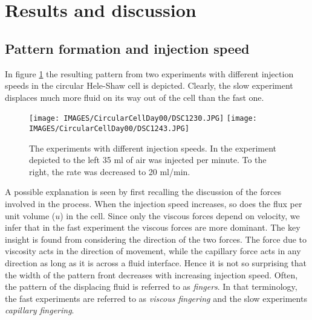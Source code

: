 \documentclass[twoside,utf8]{article}
\newcommand{\EQU}[1] { \begin{equation*} \begin{split} #1 \end{split} \end{equation*} }
\begin{document}




\section{Results and discussion}



\subsection{Pattern formation and injection speed}

In figure \ref{fig:injectionSpeeds} the resulting pattern from two experiments with different injection speeds in the circular Hele-Shaw cell is depicted. Clearly, the slow experiment displaces much more fluid on its way out of the cell than the fast one.


\begin{figure}[H]
	\texttt{[image: IMAGES/CircularCellDay00/DSC1230.JPG]}
	\texttt{[image: IMAGES/CircularCellDay00/DSC1243.JPG]}
	\caption{The experiments with different injection speeds. In the experiment depicted to the left 35 ml of air was injected per minute. To the right, the rate was decreased to 20 ml/min.  }
	\label{fig:injectionSpeeds}
\end{figure}

\noindent
A possible explanation is seen by first recalling the discussion of the forces involved in the process. When the injection speed increases, so does the flux per unit volume ($u$) in the cell. Since only the viscous forces depend on velocity, we infer that in the fast experiment the viscous forces are more dominant. The key insight is found from considering the direction of the two forces. The force due to viscosity acts in the direction of movement, while the capillary force acts in any direction as long as it is across a fluid interface. Hence it is not so surprising that the width of the pattern front decreases with increasing injection speed. Often, the pattern of the displacing fluid is referred to as {\it fingers}. In that terminology, the fast experiments are referred to as {\it viscous fingering} and the slow experiments {\it capillary fingering}.
\end{document}
